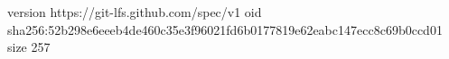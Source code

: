 version https://git-lfs.github.com/spec/v1
oid sha256:52b298e6eeeb4de460c35e3f96021fd6b0177819e62eabc147ecc8c69b0ccd01
size 257
